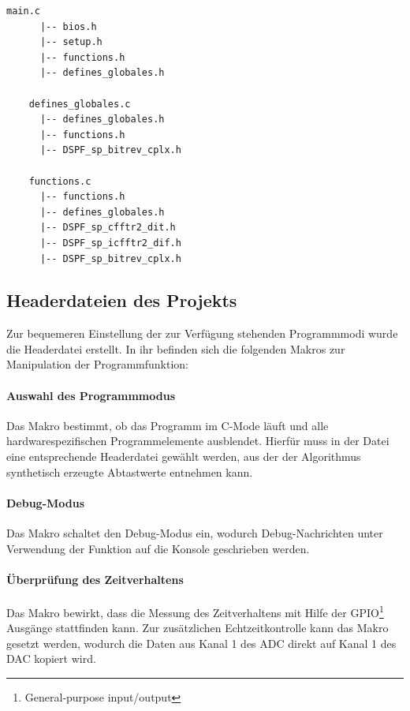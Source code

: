 \pagebreak

\begin{lstlisting}[caption={Aufbau des C-Pojekts}, label=lst:ProjektAufbau,frame=htlrb, firstnumber=1]
    main.c
      |-- bios.h
      |-- setup.h
      |-- functions.h
      |-- defines_globales.h
    
    defines_globales.c
      |-- defines_globales.h
      |-- functions.h
      |-- DSPF_sp_bitrev_cplx.h
      
    functions.c
      |-- functions.h
      |-- defines_globales.h
      |-- DSPF_sp_cfftr2_dit.h
      |-- DSPF_sp_icfftr2_dif.h
      |-- DSPF_sp_bitrev_cplx.h
\end{lstlisting}




\subsection{Headerdateien des Projekts}
\label{subsec:HeaderdateienDerProjekts}
Zur bequemeren Einstellung der zur Verfügung stehenden Programmmodi wurde die Headerdatei  erstellt. In ihr befinden sich die folgenden Makros zur Manipulation der Programmfunktion:


\paragraph{Auswahl des Programmmodus} Das Makro  bestimmt, ob das Programm im C-Mode läuft und alle hardwarespezifischen Programmelemente ausblendet. Hierfür muss in der Datei  eine entsprechende Headerdatei gewählt werden, aus der der Algorithmus synthetisch erzeugte Abtastwerte entnehmen kann.

\paragraph{Debug-Modus} Das Makro  schaltet den Debug-Modus ein, wodurch Debug-Nachrichten unter Verwendung der Funktion  auf die Konsole geschrieben werden. 

\paragraph{Überprüfung des Zeitverhaltens} Das Makro  bewirkt, dass die Messung des Zeitverhaltens mit Hilfe der GPIO\footnote{General-purpose input/output} Ausgänge stattfinden kann. Zur zusätzlichen Echtzeitkontrolle kann das Makro  gesetzt werden, wodurch die Daten aus Kanal 1 des ADC direkt auf Kanal 1 des DAC kopiert wird.

